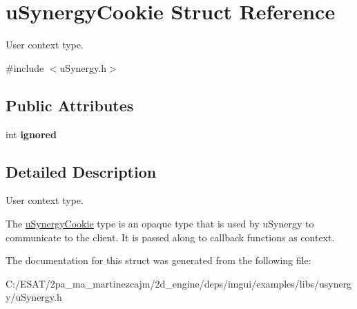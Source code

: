 \hypertarget{structu_synergy_cookie}{}\section{u\+Synergy\+Cookie Struct Reference}
\label{structu_synergy_cookie}


User context type.  




{\ttfamily \#include $<$u\+Synergy.\+h$>$}

\subsection*{Public Attributes}
\begin{DoxyCompactItemize}
\item 
\mbox{\label{structu_synergy_cookie_af6cd3fe155a3b8632e7a54311f4deea8}} 
int {\bfseries ignored}
\end{DoxyCompactItemize}


\subsection{Detailed Description}
User context type. 

The \hyperlink{structu_synergy_cookie}{u\+Synergy\+Cookie} type is an opaque type that is used by u\+Synergy to communicate to the client. It is passed along to callback functions as context. 

The documentation for this struct was generated from the following file\+:\begin{DoxyCompactItemize}
\item 
C\+:/\+E\+S\+A\+T/2pa\+\_\+ma\+\_\+martinezcajm/2d\+\_\+engine/deps/imgui/examples/libs/usynergy/u\+Synergy.\+h\end{DoxyCompactItemize}
